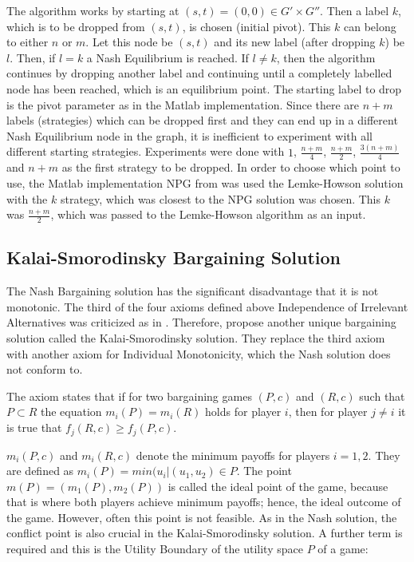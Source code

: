 The algorithm works by starting at $(s,t) = (0,0) \in G' \times G'' $. Then a label $k$, which is to be dropped from $(s,t)$, is chosen (initial pivot). This $k$ can belong to either $n$ or $m$. Let this node be $(s,t)$ and its new label (after dropping $k$) be $l$. Then, if $l=k$ a Nash Equilibrium is reached. If $l\neq k$, then the algorithm continues by dropping another label and continuing until a completely labelled node has been reached, which is an equilibrium point. The starting label to drop is the pivot parameter as in the Matlab implementation. Since there are $n+m$ labels (strategies) which can be dropped first and they can end up in a different Nash Equilibrium node in the graph, it is inefficient to experiment with all different starting strategies. Experiments were done with $1$, $\frac{n+m}{4}$, $\frac{n+m}{2}$, $\frac{3(n+m)}{4}$ and $n+m$ as the first strategy to be dropped. In order to choose which point to use, the Matlab implementation NPG from \citet{npg} was used the Lemke-Howson solution with the $k$ strategy, which was closest to the NPG solution was chosen. This $k$ was $\frac{n+m}{2}$, which was passed to the Lemke-Howson algorithm as an input.

\subsection{Kalai-Smorodinsky Bargaining Solution}
The Nash Bargaining solution has the significant disadvantage that it is not monotonic. The third of the four axioms defined above Independence of Irrelevant Alternatives was criticized as in \citet{kalai1975other}. Therefore, \citet{kalai1975other} propose another unique bargaining solution called the Kalai-Smorodinsky solution. They replace the third axiom with another axiom for Individual Monotonicity, which the Nash solution does not conform to. 

The axiom states that if for two bargaining games $(P,c)$ and $(R,c)$ such that $P \subset R$ the equation $m_i(P) = m_i(R)$ holds for player $i$, then for player $j \neq i$ it is true that $f_j(R,c) \geq f_j(P,c)$.

$m_i(P,c)$ and $m_i(R,c)$ denote the minimum payoffs for players $i = 1,2$. They are defined as $m_i(P) = min(u_i | (u_1,u_2) \in P$. The point $m(P) = (m_1(P),m_2(P))$ is called the ideal point of the game, because that is where both players achieve minimum payoffs; hence, the ideal outcome of the game. However, often this point is not feasible. As in the Nash solution, the conflict point is also crucial in the Kalai-Smorodinsky solution. A further term is required and this is the Utility Boundary of the utility space $P$ of a game:



